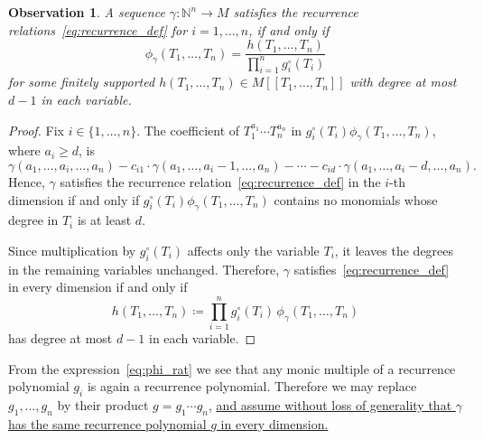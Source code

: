 \documentclass[letterpaper, 11pt, thm-restate]{article}
\numberwithin{equation}{section}
\newcommand{\N}{\mathbb{N}}
\newtheorem{observation}[theorem]{Observation}
\theoremstyle{definition}
\theoremstyle{definition}
\theoremstyle{definition}
\begin{document}
\begin{observation}
    A sequence $\gamma \colon \N^n \rightarrow M$ satisfies the recurrence relations~\eqref{eq:recurrence_def} for $i = 1, \ldots, n$, if and only if
    \begin{equation}\label{eq:phi_rat}
    \phi_{\gamma}(T_1, \ldots, T_n) = \frac{h(T_1, \ldots, T_n)}{\prod_{i=1}^n g_i^\circ(T_i)}
    \end{equation}
    for some finitely supported $h(T_1,\ldots,T_n)\in M[[T_1,\ldots,T_n]]$ with degree at most $d-1$ in each variable.
\end{observation}
\begin{proof}
Fix $i\in\{1,\ldots,n\}$. The coefficient of $T_1^{a_1}\cdots T_n^{a_n}$ in $g_i^\circ(T_i)\phi_\gamma(T_1,\ldots,T_n)$, where $a_i\ge d$, is
\[
    \gamma(a_1, \ldots, a_i, \ldots, a_n) - c_{i1} \cdot \gamma(a_1, \ldots, a_i-1, \ldots, a_n) - \cdots - c_{id} \cdot \gamma(a_1, \ldots, a_i-d, \ldots, a_n).
\]
Hence, $\gamma$ satisfies the recurrence relation~\eqref{eq:recurrence_def} in the $i$-th dimension if and only if $g_i^\circ(T_i)\phi_\gamma(T_1,\ldots,T_n)$ contains no monomials whose degree in $T_i$ is at least $d$.

Since multiplication by $g_i^\circ(T_i)$ affects only the variable $T_i$, it leaves the degrees in the remaining variables unchanged. Therefore, $\gamma$ satisfies~\eqref{eq:recurrence_def} in every dimension if and only if
\[
\textstyle
h(T_1,\ldots,T_n)
\coloneqq
\prod_{i=1}^n g_i^\circ(T_i)\,
\phi_\gamma(T_1,\ldots,T_n)
\]
has degree at most $d-1$ in each variable.
\end{proof}

From the expression~\eqref{eq:phi_rat} we see that any monic multiple of a recurrence polynomial $g_i$ is again a recurrence polynomial.
Therefore we may replace $g_1,\ldots,g_n$ by their product $g=g_1\cdots g_n$, \ul{and assume without loss of generality that $\gamma$ has the same recurrence polynomial $g$ in every dimension.}
\end{document}
